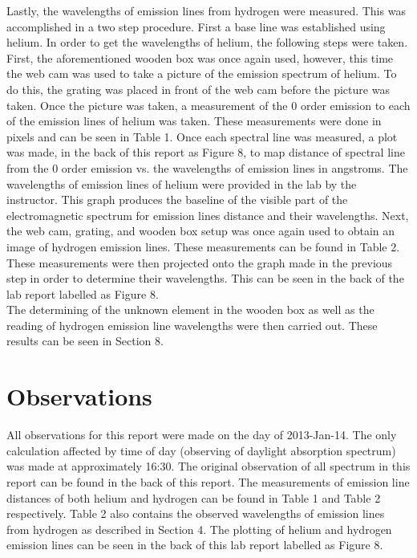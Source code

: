 \documentclass{article}
\begin{document}
Lastly, the wavelengths of emission lines from hydrogen were measured. This was 
accomplished in a two step procedure. First a base line was established using helium.
In order to get the wavelengths of helium, the following steps were taken. First, 
the aforementioned wooden box was once again used, however, this time the web cam was
used to take a picture of the emission spectrum of helium. To do this, the grating was
placed in front of the web cam before the picture was taken. Once the picture was taken,
a measurement of the 0 order emission to each of the emission lines of helium was taken.
These measurements were done in pixels and can be seen in Table 1. 
Once each spectral line was measured, a plot was made, in the back of this report as
Figure 8, to map distance of spectral line from the 0 order emission vs. the wavelengths
of emission lines in angstroms. The wavelengths of emission lines of helium were
provided in the lab by the instructor. This graph produces the baseline of the visible
part of the electromagnetic spectrum for emission lines distance and their wavelengths.
Next, the web cam, grating, and wooden box setup was once again used to obtain an
image of hydrogen emission lines. These measurements can be found in Table 2. These 
measurements were then projected onto the graph
made in the previous step in order to determine their wavelengths. This can be
seen in the back of the lab report labelled as Figure 8.\\

The determining of the unknown element in the wooden box as well as the 
reading of hydrogen 
emission line wavelengths were then carried out. These results can be seen in
Section 8.\\



\section{Observations}

All observations for this report were made on the day of 2013-Jan-14. The only
calculation affected by time of day (observing of daylight absorption spectrum)
was made at approximately 16:30. The  original observation of all spectrum in this report
can be found in the back of this report. The measurements
of emission line distances of both helium and hydrogen can be found in Table 1
and Table 2 respectively. Table 2 also contains the observed wavelengths
of emission lines from hydrogen as described in Section 4. The plotting of helium
and hydrogen emission lines can be seen in the back of this lab report labelled as
Figure 8.
\end{document}
